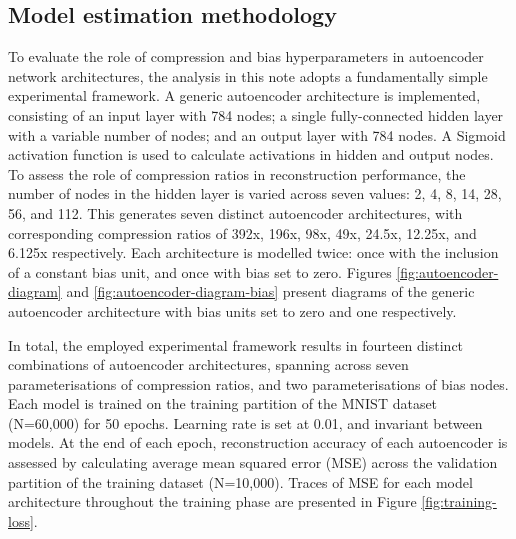 \subsection{Model estimation methodology}\label{sec:estimation}

To evaluate the role of compression and bias hyperparameters in autoencoder network architectures, the analysis in this note adopts a fundamentally simple experimental framework.
A generic autoencoder architecture is implemented, consisting of an input layer with 784 nodes; a single fully-connected hidden layer with a variable number of nodes; and an output layer with 784 nodes.
A Sigmoid activation function is used to calculate activations in hidden and output nodes. 
To assess the role of compression ratios in reconstruction performance, the number of nodes in the hidden layer is varied across seven values: 2, 4, 8, 14, 28, 56, and 112.
This generates seven distinct autoencoder architectures, with corresponding compression ratios of 392x, 196x, 98x, 49x, 24.5x, 12.25x, and 6.125x respectively.
Each architecture is modelled twice: once with the inclusion of a constant bias unit, and once with bias set to zero.
Figures \ref{fig:autoencoder-diagram} and \ref{fig:autoencoder-diagram-bias} present diagrams of the generic autoencoder architecture with bias units set to zero and one respectively.

In total, the employed experimental framework results in fourteen distinct combinations of autoencoder architectures, spanning across seven parameterisations of compression ratios, and two parameterisations of bias nodes. 
Each model is trained on the training partition of the MNIST dataset (N=60,000) for 50 epochs.
Learning rate is set at 0.01, and invariant between models.
At the end of each epoch, reconstruction accuracy of each autoencoder is assessed by calculating average mean squared error (MSE) across the validation partition of the training dataset (N=10,000).
Traces of MSE for each model architecture throughout the training phase are presented in Figure \ref{fig:training-loss}.


